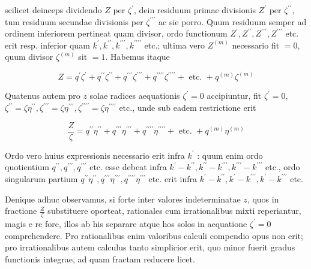 \documentclass[10pt]{article}
\begin{document}
scilicet deinceps dividendo \(Z\) per \(\zeta^{\prime}\), dein residuum primae divisionis \(Z^{\prime}\) per \(\zeta^{\prime \prime}\), tum residuum secundae divisionis per \(\zeta^{\prime \prime \prime}\) ac sie porro. Quum residuum semper ad ordinem inferiorem pertineat quam divisor, ordo functionum \(Z^{\prime}, Z^{\prime \prime}, Z^{\prime \prime \prime}, Z^{\prime \prime \prime}\) etc. erit resp. inferior quam \(k^{\prime}, k^{\prime \prime}, k^{\prime \prime \prime}, k^{\prime \prime \prime \prime}\) etc.; ultima vero \(Z^{(m)}\) necessario fit \(=0\), quum divisor \(\zeta^{(m)}\) sit \(=1\). Habemus itaque

\[
Z=q^{\prime} \zeta^{\prime}+q^{\prime \prime} \zeta^{\prime \prime}+q^{\prime \prime \prime} \zeta^{\prime \prime \prime}+q^{\prime \prime \prime \prime} \zeta^{\prime \prime \prime \prime}+\text { etc. }+q^{(m)} \zeta^{(m)}
\]

Quatenus autem pro \(z\) solae radices aequationis \(\zeta^{\prime}=0\) accipiuntur, fit \(\zeta^{\prime}=0\), \(\zeta^{\prime \prime}=\zeta \eta^{\prime \prime}, \zeta^{\prime \prime \prime}=\zeta \eta^{\prime \prime \prime}, \zeta^{\prime \prime \prime \prime}=\zeta \eta^{\prime \prime \prime \prime}\) etc., unde sub eadem restrictione erit

\[
\frac{Z}{\zeta}=q^{\prime \prime} \eta^{\prime \prime}+q^{\prime \prime \prime} \eta^{\prime \prime \prime}+q^{\prime \prime \prime \prime} \eta^{\prime \prime \prime \prime}+\text { etc. }+q^{(m)} \eta^{(m)}
\]

Ordo vero huius expressionis necessario erit infra \(k^{\prime}\) : quum enim ordo quotientium \(q^{\prime \prime}, q^{\prime \prime \prime}, q^{\prime \prime \prime}\) etc. esse debeat infra \(k^{\prime}-k^{\prime \prime}, k^{\prime \prime}-k^{\prime \prime \prime}, k^{\prime \prime \prime}-k^{\prime \prime \prime}\) etc., ordo singularum partium \(q^{\prime \prime} \eta^{\prime \prime}, q^{\prime \prime \prime} \eta^{\prime \prime \prime}, q^{\prime \prime \prime \prime} \eta^{\prime \prime \prime}\) etc. erit infra \(k^{\prime}-k^{\prime \prime}, k^{\prime}-k^{\prime \prime \prime}, k^{\prime}-k^{\prime \prime \prime}\) etc.

Denique adhuc observamus, si forte inter valores indeterminatae \(z\), quos in fractione \(\frac{Z}{\zeta}\) substituere oporteat, rationales cum irrationalibus mixti reperiantur, magis e re fore, illos ab his separare atque hos solos in aequatione \(\zeta^{\prime}=0\) comprehendere. Pro rationalibus enim valoribus calculi compendio opus non erit; pro irrationalibus autem calculus tanto simplicior erit, quo minor fuerit gradus functionis integrae, ad quam fractam reducere licet.
\end{document}
